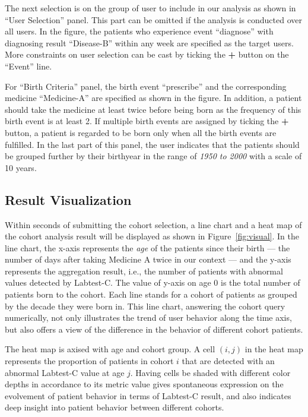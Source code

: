 The next selection is on the group of user to include in our analysis as shown in ``User Selection'' panel. This part can be omitted if the analysis is conducted over all users. 
In the figure, the patients who experience event ``diagnose'' with diagnosing result ``Disease-B'' within any week are specified as the target users.
More constraints on user selection can be cast by ticking the \textbf{+} button on the ``Event'' line.

For ``Birth Criteria'' panel, the birth event ``prescribe'' and the corresponding medicine ``Medicine-A'' are specified as shown in the figure.
In addition, a patient should take the medicine at least twice before being 
born as the frequency of this birth event is at least 2.
If multiple birth events are assigned by ticking the \textbf{+} button, a 
patient is regarded to be born only when all the birth events are fulfilled. 
In the last part of this panel, the user indicates that the patients should be grouped further by their birthyear in the range of \emph{1950 to 2000} with a scale of 10 years.

\subsection{Result Visualization}

Within seconds of submitting the cohort selection, a line chart and a heat map of the cohort analysis result will be displayed as shown in Figure~\ref{fig:visual}. In the line chart, the x-axis represents the \emph{age} of the patients since their {birth} --- the number of days after taking Medicine A twice in our context --- and the y-axis represents the aggregation result, i.e., the number of patients with abnormal values detected by Labtest-C. The value of y-axis on {age 0} is the total number of patients {born} to the cohort. 
Each line stands for a cohort of patients as grouped by the decade they were born in. 
This line chart, answering the cohort query numerically, not only illustrates the trend of user behavior along the time axis, but also offers a view of
the difference in the behavior of different cohort patients.

The heat map is axised with {age} and cohort group. 
A cell $(i,j)$ in the heat map represents the proportion of patients in cohort $i$ that are detected with an abnormal Labtest-C value at age $j$. 
Having cells be shaded with different color depths in accordance to its metric value gives spontaneous expression on the evolvement of patient behavior in terms of Labtest-C result, and also indicates deep insight into patient behavior between different cohorts. 

